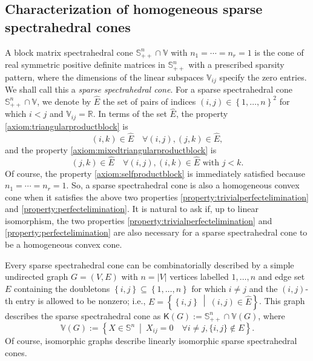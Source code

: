 \documentclass[oneside]{amsart}
\theoremstyle{plain}
\theoremstyle{definition}
\theoremstyle{remark}
\numberwithin{equation}{section}
\begin{document}
\subsection{Characterization of homogeneous sparse spectrahedral cones}
\label{section:sparsespectrahedralcones}

A block matrix spectrahedral cone $\mathbb{S}^{n}_{++} \cap \mathbb{V}$
with $n_1 = \dotsb = n_r = 1$ is the cone of real symmetric positive
definite matrices in $\mathbb{S}^{n}_{++}$ with a prescribed sparsity
pattern, where the dimensions of the linear subspaces $\mathbb{V}_{ij}$
specify the zero entries. We shall call this a \emph{sparse spectrahedral
cone}. For a sparse spectrahedral cone $\mathbb{S}^{n}_{++} \cap
\mathbb{V}$, we denote by $\hat{E}$ the set of pairs of indices $(i, j) \in
\left\{1, \dotsc, n\right\}^{2}$ for which $i < j$ and $\mathbb{V}_{ij} =
\mathbb{R}$. In terms of the set $\hat{E}$, the property
\ref{axiom:triangularproductblock} is
\begin{equation}
\label{property:trivialperfectelimination}
(i, k) \in \hat{E} \quad \forall (i, j), (j, k) \in \hat{E},
\end{equation}
and the property \ref{axiom:mixedtriangularproductblock} is
\begin{equation}
\label{property:perfectelimination}
(j, k) \in \hat{E} \quad \forall (i, j), (i, k) \in \hat{E} \text{ with } j
< k.
\end{equation}
Of course, the property \ref{axiom:selfproductblock} is immediately
satisfied because $n_{1} = \dotsb = n_{r} = 1$. So, a sparse spectrahedral
cone is also a homogeneous convex cone when it satisfies the above two
properties \eqref{property:trivialperfectelimination} and
\eqref{property:perfectelimination}. It is natural to ask if, up to linear
isomorphism, the two properties  \eqref{property:trivialperfectelimination}
and \eqref{property:perfectelimination} are also necessary for a sparse
spectrahedral cone to be a homogeneous convex cone.

Every sparse spectrahedral cone can be combinatorially described by a
simple undirected graph $G = (V, E)$ with $n = \lvert V \rvert$ vertices
labelled $1, \dotsc, n$ and edge set $E$ containing the doubletons
$\left\{i, j\right\} \subseteq \left\{1, \dotsc, n\right\}$ for which $i
\neq j$ and the $(i, j)$-th entry is allowed to be nonzero; i.e., $E =
\left\{\left\{i, j\right\}\ \middle|\ (i, j) \in \hat{E}\right\}$. This
graph describes the sparse spectrahedral cone as $\mathsf{K}(G) :=
\mathbb{S}^{n}_{++} \cap \mathbb{V}(G)$, where
\[
\mathbb{V}(G) := \left\{X \in \mathbb{S}^{n}\ \middle|\ X_{ij} = 0 \quad
\forall i \neq j, \{i, j\} \notin E\right\}.
\]
Of course, isomorphic graphs describe linearly isomorphic sparse
spectrahedral cones.
\end{document}
